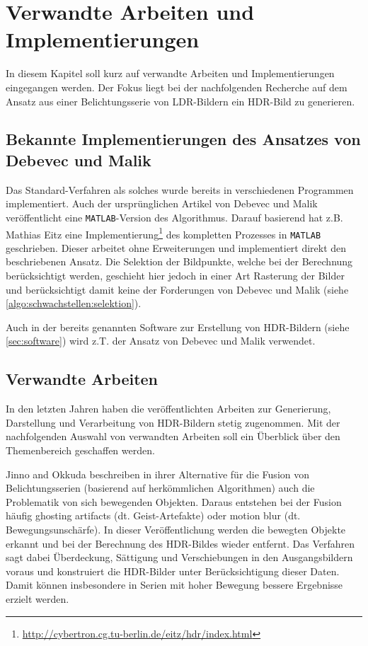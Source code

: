 \chapter{Verwandte Arbeiten und Implementierungen}
\label{chap:references}

In diesem Kapitel soll kurz auf verwandte Arbeiten und Implementierungen eingegangen werden. Der Fokus liegt bei der nachfolgenden Recherche auf dem Ansatz aus einer Belichtungsserie von \gls{LDR}-Bildern ein \gls{HDR}-Bild zu generieren.

\section{Bekannte Implementierungen des Ansatzes von Debevec und Malik}
\label{sec:implementations}
Das Standard-Verfahren als solches wurde bereits in verschiedenen Programmen implementiert. Auch der ursprünglichen Artikel von Debevec und Malik veröffentlicht eine \texttt{MATLAB}-Version des Algorithmus. 
Darauf basierend hat z.B. Mathias Eitz eine Implementierung\footnote{\url{http://cybertron.cg.tu-berlin.de/eitz/hdr/index.html}} des kompletten Prozesses in \texttt{MATLAB} geschrieben. Dieser arbeitet ohne Erweiterungen und implementiert direkt den beschriebenen Ansatz. Die Selektion der Bildpunkte, welche bei der Berechnung berücksichtigt werden, geschieht hier jedoch in einer Art Rasterung der Bilder und berücksichtigt damit keine der Forderungen von Debevec und Malik (siehe \autoref{algo:schwachstellen:selektion}). 

Auch in der bereits genannten Software zur Erstellung von \gls{HDR}-Bildern (siehe \autoref{sec:software}) wird z.T. der Ansatz von Debevec und Malik verwendet.


\section{Verwandte Arbeiten}

In den letzten Jahren haben die veröffentlichten Arbeiten zur Generierung, Darstellung und Verarbeitung von \gls{HDR}-Bildern stetig zugenommen. Mit der nachfolgenden Auswahl von verwandten Arbeiten soll ein Überblick über den Themenbereich geschaffen werden.

Jinno and Okkuda \cite{Jinno} beschreiben in ihrer Alternative für die Fusion von Belichtungsserien (basierend auf herkömmlichen Algorithmen) auch die Problematik von sich bewegenden Objekten. Daraus entstehen bei der Fusion häufig ghosting artifacts (dt. Geist-Artefakte) oder motion blur (dt. Bewegungsunschärfe). In dieser Veröffentlichung werden die bewegten Objekte erkannt und bei der Berechnung des \gls{HDR}-Bildes wieder entfernt. Das Verfahren sagt dabei Überdeckung, Sättigung und Verschiebungen in den Ausgangsbildern voraus und konstruiert die \gls{HDR}-Bilder unter Berücksichtigung dieser Daten. Damit können insbesondere in Serien mit hoher Bewegung bessere Ergebnisse erzielt werden.


